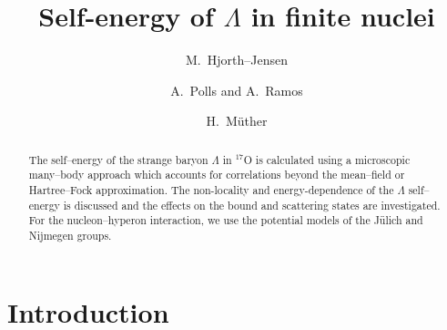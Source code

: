 \clearpage








\title{Self-energy of $\Lambda$ in finite nuclei}

\author{M.\ Hjorth--Jensen}


\address{ECT*, European Centre for Studies in
Theoretical Nuclear Physics
and Related Areas, Trento, Italy}

\author{A.\ Polls and A.\ Ramos}

\address{Departament d'Estructura i Constituents de la Mat\`eria,
Universitat de Barcelona, Barcelona, Spain}

\author{H.\ M\"{u}ther}

\address{Institut f\"{u}r Theoretische Physik, Universit\"{a}t T\"{u}bingen,
T\"{u}bingen, Germany}




\maketitle

\begin{abstract}
The self--energy of the strange baryon
$\Lambda$ in $^{17}$O is calculated using a microscopic
many--body approach which accounts for correlations beyond the
mean--field or Hartree--Fock approximation. The non-locality and
energy-dependence of the $\Lambda$ self--energy is discussed and the
effects on the bound and scattering states are investigated.
For the nucleon--hyperon interaction, we use the potential models of the
J\"{u}lich and Nijmegen groups.
\end{abstract}



\section{Introduction}



